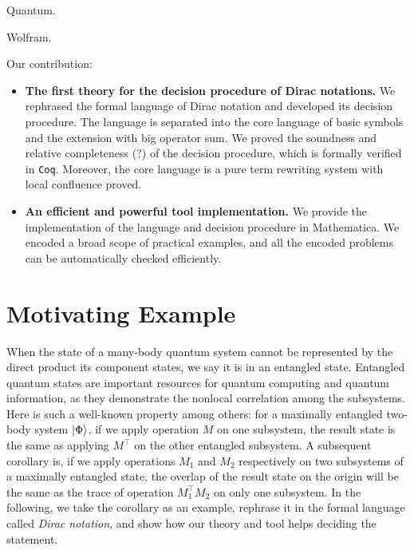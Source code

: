 \documentclass[manuscript, review, timestamp]{acmart}
\begin{document}
Quantum. \cite{Nielsen2010}

Wolfram. \cite{WolframLanguage}

\vspace{2em}

Our contribution:
\begin{itemize}
  \item \textbf{The first theory for the decision procedure of Dirac notations.} 
  We rephrased the formal language of Dirac notation and developed its decision procedure. The language is separated into the core language of basic symbols and the extension with big operator sum. We proved the soundness and relative completeness (?) of the decision procedure, which is formally verified in \texttt{Coq}. Moreover, the core language is a pure term rewriting system with local confluence proved.
  \item \textbf{An efficient and powerful tool implementation.}
  We provide the implementation of the language and decision procedure in Mathematica. We encoded a broad scope of practical examples, and all the encoded problems can be automatically checked efficiently.
\end{itemize}



\section{Motivating Example}

When the state of a many-body quantum system cannot be represented by the direct product its component states, we say it is in an entangled state. Entangled quantum states are important resources for quantum computing and quantum information, as they demonstrate the nonlocal correlation among the subsystems. 
Here is such a well-known property among others: for a maximally entangled two-body system $\ket{\Phi}$, if we apply operation $M$ on one subsystem, the result state is the same as applying $M^\top$ on the other entangled subsystem. 
A subsequent corollary is, if we apply operations $M_1$ and $M_2$ respectively on two subsystems of a maximally entangled state, the overlap of the result state on the origin will be the same as the trace of operation $M_1^\top M_2$ on only one subsystem. In the following, we take the corollary as an example, rephrase it in the formal language called \textit{Dirac notation},
and show how our theory and tool helps deciding the statement.
\end{document}
